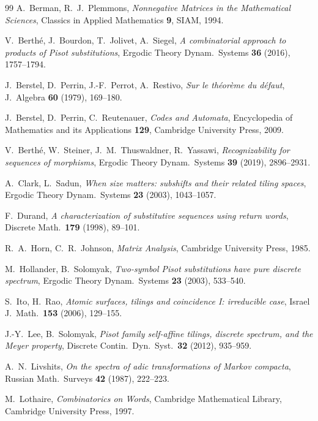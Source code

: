 \documentclass[11pt]{amsart}
\theoremstyle{plain}
\theoremstyle{definition}
\theoremstyle{remark}
\begin{document}
\begin{thebibliography}{99}
 A.~Berman, R.~J.~Plemmons, \emph{Nonnegative Matrices in the Mathematical Sciences}, Classics in Applied Mathematics \textbf{9}, SIAM, 1994.

 V.~Berth\'e, J.~Bourdon, T.~Jolivet, A.~Siegel, \emph{A combinatorial approach to products of Pisot substitutions}, Ergodic Theory Dynam.\ Systems \textbf{36} (2016), 1757--1794.

 J.~Berstel, D.~Perrin, J.-F.~Perrot, A.~Restivo, \emph{Sur le th\'eor\`eme du d\'efaut}, J.\ Algebra \textbf{60} (1979), 169--180.

 J.~Berstel, D.~Perrin, C.~Reutenauer, \emph{Codes and Automata}, Encyclopedia of Mathematics and its Applications \textbf{129}, Cambridge University Press, 2009.

 V.~Berth\'e, W.~Steiner, J.~M.~Thuswaldner, R.~Yassawi, \emph{Recognizability for sequences of morphisms}, Ergodic Theory Dynam.\ Systems \textbf{39} (2019), 2896--2931.

 A.~Clark, L.~Sadun, \emph{When size matters: subshifts and their related tiling spaces}, Ergodic Theory Dynam.\ Systems \textbf{23} (2003), 1043--1057.

 F.~Durand, \emph{A characterization of substitutive sequences using return words}, Discrete Math.\ \textbf{179} (1998), 89--101.

 R.~A.~Horn, C.~R.~Johnson, \emph{Matrix Analysis}, Cambridge University Press, 1985.

 M.~Hollander, B.~Solomyak, \emph{Two-symbol Pisot substitutions have pure discrete spectrum}, Ergodic Theory Dynam.\ Systems \textbf{23} (2003), 533--540.

 S.~Ito, H.~Rao, \emph{Atomic surfaces, tilings and coincidence I: irreducible case}, Israel J.\ Math.\ \textbf{153} (2006), 129--155.

 J.-Y.~Lee, B.~Solomyak, \emph{Pisot family self-affine tilings, discrete spectrum, and the Meyer property}, Discrete Contin.\ Dyn.\ Syst.\ \textbf{32} (2012), 935--959.

 A.~N.~Livshits, \emph{On the spectra of adic transformations of Markov compacta}, Russian Math.\ Surveys \textbf{42} (1987), 222--223.

 M.~Lothaire, \emph{Combinatorics on Words}, Cambridge Mathematical Library, Cambridge University Press, 1997.


\end{thebibliography}
\end{document}
